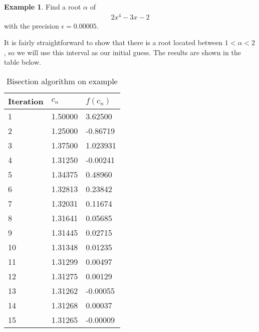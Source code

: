 \documentclass[
  digital, %
  table,   %
  nolof,     %
  nolot,     %
	draft, %
]{fithesis3}
\begin{document}
\theoremstyle{definition}
\newtheorem{example}{Example}[section]
\begin{example}
Find a root $\alpha$ of 
\begin{align}
      2x^{4} - 3x - 2
\end{align}
with the precision $\epsilon = 0.00005$.
\end{example}
It is fairly straightforward to show that there is a root located between $1 < \alpha < 2$, so we will use this interval as our initial guess. The results are shown in the table below.
\begin{table}
  \begin{tabularx}{\textwidth}{lll}
    \toprule
    Iteration & $c_{n}$ & $f(c_{n})$\\
    \midrule
    1 & 1.50000 & 3.62500 \\
    2 & 1.25000 & -0.86719 \\
    3 & 1.37500 & 1.023931 \\
    4 & 1.31250 & -0.00241 \\
    5 & 1.34375 & 0.48960 \\
    6 & 1.32813 & 0.23842 \\
    7 & 1.32031 & 0.11674 \\
    8 & 1.31641 & 0.05685 \\
    9 & 1.31445 & 0.02715 \\
    10 & 1.31348 & 0.01235 \\
    11 & 1.31299 & 0.00497 \\
    12 & 1.31275 & 0.00129 \\
    13 & 1.31262 & -0.00055 \\
    14 & 1.31268 & 0.00037 \\
    15 & 1.31265 & -0.00009 \\
    \bottomrule
  \end{tabularx}
  \caption{Bisection algorithm on example}
  \label{tab:bis}
\end{table}
\end{document}
